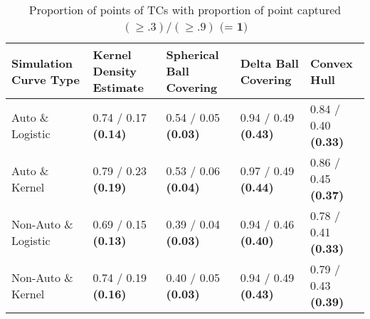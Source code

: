 \begin{table}[ht!]
\centering
\begin{tabular}{|R{1.2in}||L{.95in}L{.95in}|L{.95in}L{.95in}|}
  \hline
Simulation Curve Type & Kernel Density Estimate & Spherical Ball Covering & Delta Ball Covering & Convex Hull \\ 
  \hline
Auto \& Logistic & 0.74 / 0.17 \textbf{(0.14)} & 0.54 / 0.05 \textbf{(0.03)} & 0.94 / 0.49 \textbf{(0.43)} & 0.84 / 0.40 \textbf{(0.33)} \\ 
  Auto \& Kernel & 0.79 / 0.23 \textbf{(0.19)} & 0.53 / 0.06 \textbf{(0.04)} & 0.97 / 0.49 \textbf{(0.44)} & 0.86 / 0.45 \textbf{(0.37)} \\ 
  Non-Auto \& Logistic & 0.69 / 0.15 \textbf{(0.13)} & 0.39 / 0.04 \textbf{(0.03)} & 0.94 / 0.46 \textbf{(0.40)} & 0.78 / 0.41 \textbf{(0.33)} \\ 
  Non-Auto \& Kernel & 0.74 / 0.19 \textbf{(0.16)} & 0.40 / 0.05 \textbf{(0.03)} & 0.94 / 0.49 \textbf{(0.43)} & 0.79 / 0.43 \textbf{(0.39)} \\ 
   \hline
\end{tabular}
\caption{Proportion of points of TCs with proportion of point captured  \((\geq .3) / (\geq .9)\) \(\textbf{(= 1)}\)} 
\label{tab:prop_captured}
\end{table}
